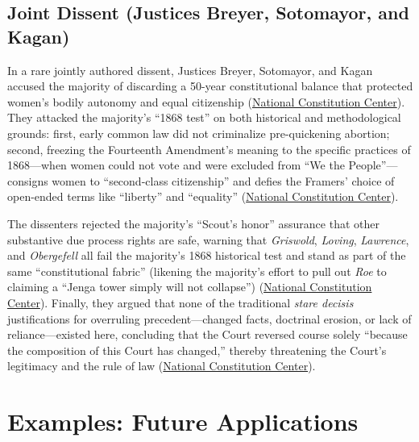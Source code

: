\documentclass[12pt]{article}
\begin{document}
\subsection{Joint Dissent (Justices Breyer, Sotomayor, and Kagan)}

In a rare jointly authored dissent, Justices Breyer, Sotomayor, and Kagan accused the majority of discarding a 50-year constitutional balance that protected women's bodily autonomy and equal citizenship (\href{https://constitutioncenter.org/the-constitution/supreme-court-case-library/dobbs-v-jackson-womens-health-organization}{National Constitution Center}). They attacked the majority's ``1868 test'' on both historical and methodological grounds: first, early common law did not criminalize pre-quickening abortion; second, freezing the Fourteenth Amendment's meaning to the specific practices of 1868---when women could not vote and were excluded from ``We the People''---consigns women to ``second-class citizenship'' and defies the Framers' choice of open-ended terms like ``liberty'' and ``equality'' (\href{https://constitutioncenter.org/the-constitution/supreme-court-case-library/dobbs-v-jackson-womens-health-organization}{National Constitution Center}).

The dissenters rejected the majority's ``Scout's honor'' assurance that other substantive due process rights are safe, warning that \textit{Griswold}, \textit{Loving}, \textit{Lawrence}, and \textit{Obergefell} all fail the majority's 1868 historical test and stand as part of the same ``constitutional fabric'' (likening the majority's effort to pull out \textit{Roe} to claiming a ``Jenga tower simply will not collapse'') (\href{https://constitutioncenter.org/the-constitution/supreme-court-case-library/dobbs-v-jackson-womens-health-organization}{National Constitution Center}). Finally, they argued that none of the traditional \textit{stare decisis} justifications for overruling precedent---changed facts, doctrinal erosion, or lack of reliance---existed here, concluding that the Court reversed course solely ``because the composition of this Court has changed,'' thereby threatening the Court's legitimacy and the rule of law (\href{https://constitutioncenter.org/the-constitution/supreme-court-case-library/dobbs-v-jackson-womens-health-organization}{National Constitution Center}).

\section{Examples: Future Applications}
\end{document}
